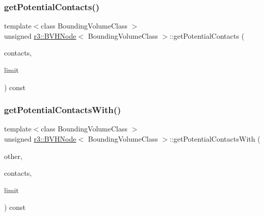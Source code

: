 \subsubsection{\texorpdfstring{get\+Potential\+Contacts()}{getPotentialContacts()}}
{\footnotesize\ttfamily template$<$class Bounding\+Volume\+Class $>$ \\
unsigned \mbox{\hyperlink{classr3_1_1_b_v_h_node}{r3\+::\+B\+V\+H\+Node}}$<$ Bounding\+Volume\+Class $>$\+::get\+Potential\+Contacts (\begin{DoxyParamCaption}\item[{\mbox{\hyperlink{classr3_1_1_collision_pair}{Collision\+Pair}} $\ast$}]{contacts,  }\item[{unsigned}]{limit }\end{DoxyParamCaption}) const}

\mbox{\label{classr3_1_1_b_v_h_node_abf81453da8179650565a0a5379ccb5cb}} 
\subsubsection{\texorpdfstring{get\+Potential\+Contacts\+With()}{getPotentialContactsWith()}}
{\footnotesize\ttfamily template$<$class Bounding\+Volume\+Class $>$ \\
unsigned \mbox{\hyperlink{classr3_1_1_b_v_h_node}{r3\+::\+B\+V\+H\+Node}}$<$ Bounding\+Volume\+Class $>$\+::get\+Potential\+Contacts\+With (\begin{DoxyParamCaption}\item[{\mbox{\hyperlink{classr3_1_1_b_v_h_node}{B\+V\+H\+Node}}$<$ Bounding\+Volume\+Class $>$ $\ast$}]{other,  }\item[{\mbox{\hyperlink{classr3_1_1_collision_pair}{Collision\+Pair}} $\ast$}]{contacts,  }\item[{unsigned}]{limit }\end{DoxyParamCaption}) const\hspace{0.3cm}{\ttfamily [protected]}}

\mbox{\label{classr3_1_1_b_v_h_node_ab6f91727e36689a7edc9f8c168ab904b}} 
